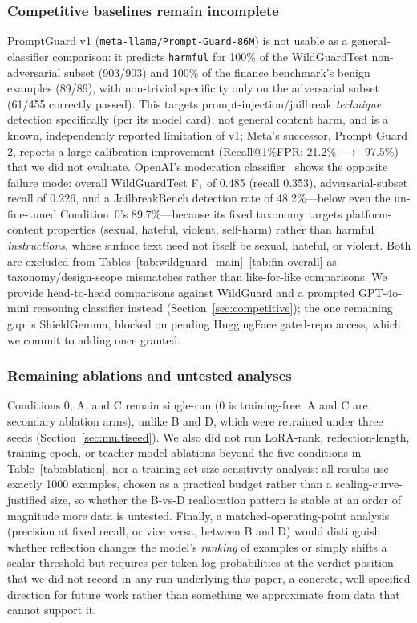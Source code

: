 \documentclass[superintelligence,article,accept,moreauthors]{Definitions/mdpi}
\begin{document}
\subsubsection{Competitive baselines remain incomplete}
PromptGuard v1 (\texttt{meta-llama/Prompt-Guard-86M}) is not usable as a general-classifier comparison: it predicts \texttt{harmful} for 100\% of the WildGuardTest non-adversarial subset (903/903) and 100\% of the finance benchmark's benign examples (89/89), with non-trivial specificity only on the adversarial subset (61/455 correctly passed). This targets prompt-injection/jailbreak \emph{technique} detection specifically (per its model card), not general content harm, and is a known, independently reported limitation of v1; Meta's successor, Prompt Guard 2, reports a large calibration improvement (Recall@1\%FPR: 21.2\%~$\to$~97.5\%) that we did not evaluate. OpenAI's moderation classifier~\citep{markov2023holistic} shows the opposite failure mode: overall WildGuardTest F$_1$ of 0.485 (recall 0.353), adversarial-subset recall of 0.226, and a JailbreakBench detection rate of 48.2\%---below even the un-fine-tuned Condition~0's 89.7\%---because its fixed taxonomy targets platform-content properties (sexual, hateful, violent, self-harm) rather than harmful \emph{instructions}, whose surface text need not itself be sexual, hateful, or violent. Both are excluded from Tables~\ref{tab:wildguard_main}--\ref{tab:fin-overall} as taxonomy/design-scope mismatches rather than like-for-like comparisons. We provide head-to-head comparisons against WildGuard and a prompted GPT-4o-mini reasoning classifier instead (Section~\ref{sec:competitive}); the one remaining gap is ShieldGemma, blocked on pending HuggingFace gated-repo access, which we commit to adding once granted.

\subsubsection{Remaining ablations and untested analyses}
Conditions 0, A, and C remain single-run (0 is training-free; A and C are secondary ablation arms), unlike B and D, which were retrained under three seeds (Section~\ref{sec:multiseed}). We also did not run LoRA-rank, reflection-length, training-epoch, or teacher-model ablations beyond the five conditions in Table~\ref{tab:ablation}, nor a training-set-size sensitivity analysis: all results use exactly 1000 examples, chosen as a practical budget rather than a scaling-curve-justified size, so whether the B-vs-D reallocation pattern is stable at an order of magnitude more data is untested. Finally, a matched-operating-point analysis (precision at fixed recall, or vice versa, between B and D) would distinguish whether reflection changes the model's \emph{ranking} of examples or simply shifts a scalar threshold but requires per-token log-probabilities at the verdict position that we did not record in any run underlying this paper, a concrete, well-specified direction for future work rather than something we approximate from data that cannot support it.
\end{document}
